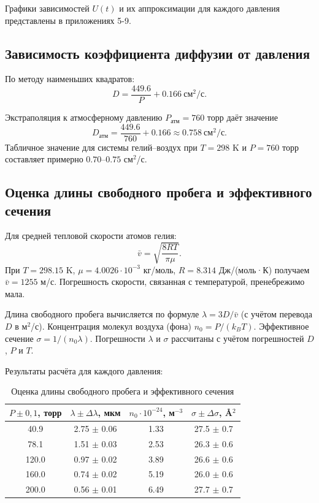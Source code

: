 \documentclass[a4paper]{article}
\begin{document}
	\newpage
	Графики зависимостей \(U(t)\) и их аппроксимации для каждого давления представлены в приложениях 5-9.
	
	\subsection{Зависимость коэффициента диффузии от давления}
	
	По методу наименьших квадратов:
	\[
	D = \frac{449.6}{P} + 0.166 \ \text{см}^2/\text{с}.
	\]
	
	Экстраполяция к атмосферному давлению \(P_{\text{атм}} = 760\) торр даёт значение
	\[
	D_{\text{атм}} = \frac{449.6}{760} + 0.166 \approx 0.758 \ \text{см}^2/\text{с}.
	\]
	Табличное значение для системы гелий–воздух при \(T = 298\) K и \(P = 760\) торр составляет примерно \(0.70\)–\(0.75\) см\(^2\)/с.
	
	\subsection{Оценка длины свободного пробега и эффективного сечения}
	
	Для средней тепловой скорости атомов гелия:
	\[
	\bar{v} = \sqrt{\frac{8RT}{\pi\mu}}.
	\]
	При \(T = 298.15\) K, \(\mu = 4.0026\cdot10^{-3}\) кг/моль, \(R = 8.314\) Дж/(моль·К) получаем \(\bar{v} = 1255\) м/с. Погрешность скорости, связанная с температурой, пренебрежимо мала.
	
	Длина свободного пробега вычисляется по формуле \(\lambda = 3D/\bar{v}\) (с учётом перевода \(D\) в м\(^2\)/с). Концентрация молекул воздуха (фона) \(n_0 = P/(k_B T)\). Эффективное сечение \(\sigma = 1/(n_0 \lambda)\). Погрешности \(\lambda\) и \(\sigma\) рассчитаны с учётом погрешностей \(D\), \(P\) и \(T\).
	
	Результаты расчёта для каждого давления:
	
	\begin{table}[h]
		\centering
		\caption{Оценка длины свободного пробега и эффективного сечения}
		\begin{tabular}{|c|c|c|c|}
			\hline
			\(P \pm 0,1\), торр & \(\lambda \pm \Delta\lambda\), мкм & \(n_0\cdot10^{-24}\), м\(^{-3}\) & \(\sigma \pm \Delta\sigma\), Å\(^2\) \\ \hline
			40.9 & 2.75 \(\pm\) 0.06 & 1.33 & 27.5 \(\pm\) 0.7 \\
			78.1 & 1.51 \(\pm\) 0.03 & 2.53 & 26.3 \(\pm\) 0.6 \\
			120.0 & 0.97 \(\pm\) 0.02 & 3.89 & 26.6 \(\pm\) 0.6 \\
			160.0 & 0.74 \(\pm\) 0.02 & 5.19 & 26.0 \(\pm\) 0.6 \\
			200.0 & 0.56 \(\pm\) 0.01 & 6.49 & 27.7 \(\pm\) 0.7 \\ \hline
		\end{tabular}
	\end{table}
	
\end{document}
